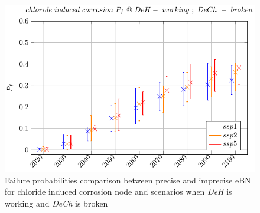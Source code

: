 \begin{figure}[H]
    \centering
    \includegraphics[width=\linewidth]{imgs/pdfs/21_Chloride_comparizon_workingbroken.pdf}
    \caption{Failure probabilities comparison between precise and imprecise eBN for chloride induced corrosion node and scenarios when \textit{DeH} is working and \textit{DeCh} is broken}\label{comparizon_ch_brokenworking}
\end{figure}

